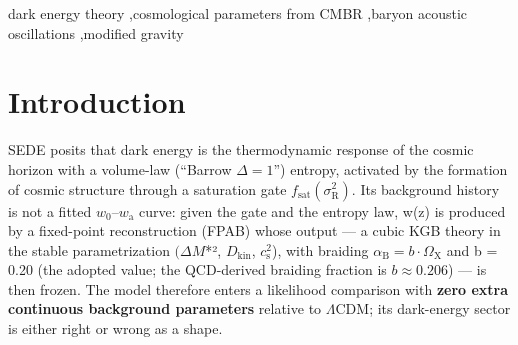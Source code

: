 \documentclass[preprint,12pt]{elsarticle}
\begin{document}
\begin{frontmatter}
\begin{abstract}
counterpart of the compressed-CMB preference reported in the companion
cosmology paper (there \(\Delta \mathrm{DIC} \approx  -3.5\) to
\(-4.7\), its upper end carried by the contested local-\(H_{0}\) prior
and the compression); the independent full-likelihood test here lands at
the conservative end, \(\Delta \mathrm{DIC} \approx  -3.0\). En route we
diagnose and fix a numerical pathology of the stable-parametrization
scalar sector (a spurious late-time oscillation seeded at the
GR\(\to\)EFT transition that mimics a large ISW signal), and we validate
the corrected pipeline exhaustively. SEDE's discriminating predictions
survive intact and are led by the one that does not depend on the solver
regime: a \textbf{+2--3\% scale-independent \(f\sigma 8\) enhancement}
through the RSD range --- fixed by the sub-horizon coupling
\(\mu _\infty  = 1.05\), independent of the tachyonic-window
regularization, opposite in sign to what would ease the \(S_{8}\)
tension, and within DESI DR3/Euclid reach --- with a corroborating
\textbf{−7.6\% ISW suppression} at ℓ = 2 (computed below the window and
correspondingly more model-dependent). The pipeline is rerunnable from
the released configurations and a pinned fork of the Boltzmann code (the
chain products and DIC-reduction script are to be committed with the
release; see Reproducibility).
\end{abstract}

\begin{keyword}
dark energy theory \sep cosmological parameters from CMBR \sep baryon acoustic
oscillations \sep modified gravity
\end{keyword}

\end{frontmatter}

\section{Introduction}\label{sec-1}

SEDE posits that dark energy is the thermodynamic response of the cosmic
horizon with a volume-law (``Barrow \(\Delta  = 1\)'') entropy,
activated by the formation of cosmic structure through a saturation gate
\(f_{\mathrm{sat}}(\sigma _{\mathrm{R}}^{2})\). Its background history
is not a fitted \(w_{0}\)--\(w_{\mathrm{a}}\) curve: given the gate and
the entropy law, w(z) is produced by a fixed-point reconstruction (FPAB)
whose output --- a cubic KGB theory in the stable parametrization
\((\Delta M\)*², \(D_{\mathrm{kin}}\), \(c_{\mathrm{s}}^{2}\)), with
braiding \(\alpha _{\mathrm{B}} = b\cdot \Omega _{\mathrm{X}}\) and b =
0.20 (the adopted value; the QCD-derived braiding fraction is
\(b \approx  0.206\)) --- is then frozen. The model therefore enters a
likelihood comparison with \textbf{zero extra continuous background
parameters} relative to \(\Lambda \mathrm{CDM}\); its dark-energy sector
is either right or wrong as a shape.
\end{document}

